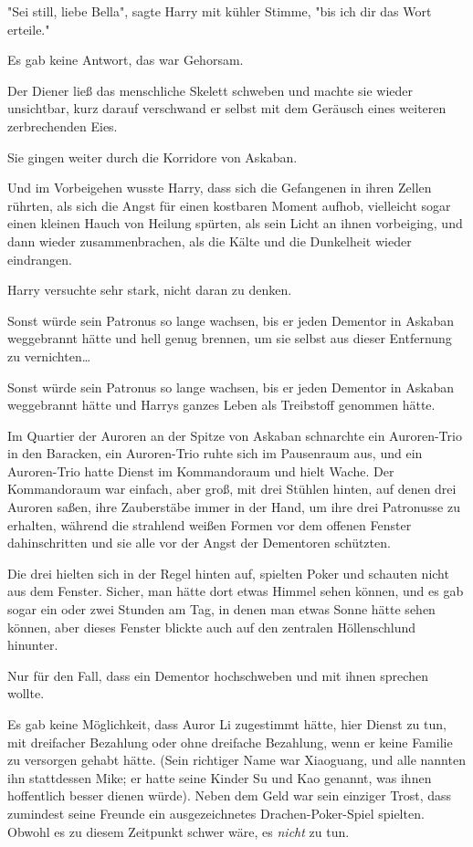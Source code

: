 {"Sei still, liebe Bella", sagte Harry mit kühler Stimme, "bis ich dir das Wort erteile."

Es gab keine Antwort, das war Gehorsam.

Der Diener ließ das menschliche Skelett schweben und machte sie wieder unsichtbar, kurz darauf verschwand er selbst mit dem Geräusch eines weiteren zerbrechenden Eies.

Sie gingen weiter durch die Korridore von Askaban.

Und im Vorbeigehen wusste Harry, dass sich die Gefangenen in ihren Zellen rührten, als sich die Angst für einen kostbaren Moment aufhob, vielleicht sogar einen kleinen Hauch von Heilung spürten, als sein Licht an ihnen vorbeiging, und dann wieder zusammenbrachen, als die Kälte und die Dunkelheit wieder eindrangen.

Harry versuchte sehr stark, nicht daran zu denken.

Sonst würde sein Patronus so lange wachsen, bis er jeden Dementor in Askaban weggebrannt hätte und hell genug brennen, um sie selbst aus dieser Entfernung zu vernichten…

Sonst würde sein Patronus so lange wachsen, bis er jeden Dementor in Askaban weggebrannt hätte und Harrys ganzes Leben als Treibstoff genommen hätte.

Im Quartier der Auroren an der Spitze von Askaban schnarchte ein Auroren-Trio in den Baracken, ein Auroren-Trio ruhte sich im Pausenraum aus, und ein Auroren-Trio hatte Dienst im Kommandoraum und hielt Wache. Der Kommandoraum war einfach, aber groß, mit drei Stühlen hinten, auf denen drei Auroren saßen, ihre Zauberstäbe immer in der Hand, um ihre drei Patronusse zu erhalten, während die strahlend weißen Formen vor dem offenen Fenster dahinschritten und sie alle vor der Angst der Dementoren schützten.

Die drei hielten sich in der Regel hinten auf, spielten Poker und schauten nicht aus dem Fenster. Sicher, man hätte dort etwas Himmel sehen können, und es gab sogar ein oder zwei Stunden am Tag, in denen man etwas Sonne hätte sehen können, aber dieses Fenster blickte auch auf den zentralen Höllenschlund hinunter.

Nur für den Fall, dass ein Dementor hochschweben und mit ihnen sprechen wollte.

Es gab keine Möglichkeit, dass Auror Li zugestimmt hätte, hier Dienst zu tun, mit dreifacher Bezahlung oder ohne dreifache Bezahlung, wenn er keine Familie zu versorgen gehabt hätte. (Sein richtiger Name war Xiaoguang, und alle nannten ihn stattdessen Mike; er hatte seine Kinder Su und Kao genannt, was ihnen hoffentlich besser dienen würde). Neben dem Geld war sein einziger Trost, dass zumindest seine Freunde ein ausgezeichnetes Drachen-Poker-Spiel spielten. Obwohl es zu diesem Zeitpunkt schwer wäre, es \emph{nicht} zu tun.

}
